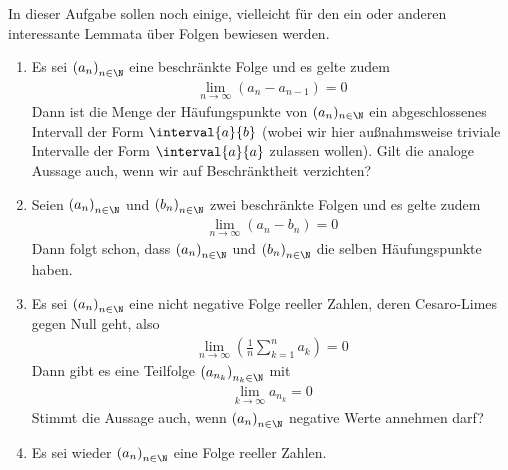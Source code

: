 \begin{prob}
  In dieser Aufgabe sollen noch einige, vielleicht für den ein oder anderen
  interessante Lemmata über Folgen bewiesen werden.
  \begin{enumerate}[label=(\alph*)]
  \item Es sei $\left( a_n \right)_{ n \in \N}$ eine beschränkte Folge und es
    gelte zudem
    \begin{equation*}
      \begin{split}
        \lim_{n \to \infty} \left( a_n - a_{n-1} \right) = 0
      \end{split}
    \end{equation*}
    Dann ist die Menge der Häufungspunkte von $(a_n)_{n \in \N}$ ein
    abgeschlossenes Intervall der Form $\interval{a}{b}$ (wobei wir hier
    außnahmsweise triviale Intervalle der Form $\interval{a}{a}$ zulassen
    wollen). Gilt die analoge Aussage auch, wenn wir auf Beschränktheit
    verzichten?
  \item Seien $\left( a_n \right)_{ n \in \N}$ und
    $\left( b_n \right)_{ n \in \N}$ zwei beschränkte Folgen und es gelte zudem
    \begin{equation*}
      \begin{split}
        \lim_{n \to \infty} (a_n - b_n) = 0
      \end{split}
    \end{equation*}
    Dann folgt schon, dass $\left( a_n \right)_{n \in \N}$ und
    $\left( b_n \right)_{n \in \N}$ die selben Häufungspunkte haben.
  \item Es sei $\left( a_n \right)_{n \in \N}$ eine nicht negative Folge reeller
    Zahlen, deren Cesaro-Limes gegen Null geht, also
    \begin{equation*}
      \begin{split}
        \lim_{n \to \infty}{\left( \frac{1}{n} \sum_{ k=1 }^{ n } a_k \right)}
        =
        0
      \end{split}
    \end{equation*}
    Dann gibt es eine Teilfolge $\left( a_{n_k} \right)_{n_k \in \N}$ mit
    \begin{equation*}
      \begin{split}
        \lim_{k \to \infty} a_{n_k} = 0
      \end{split}
    \end{equation*}
    Stimmt die Aussage auch, wenn $\left( { a }_{ n } \right)_{ n \in \N}$
    negative Werte annehmen darf?
  \item Es sei wieder $\left( a_n \right)_{n \in \N}$ eine Folge reeller Zahlen.

\end{enumerate}
\end{prob}
